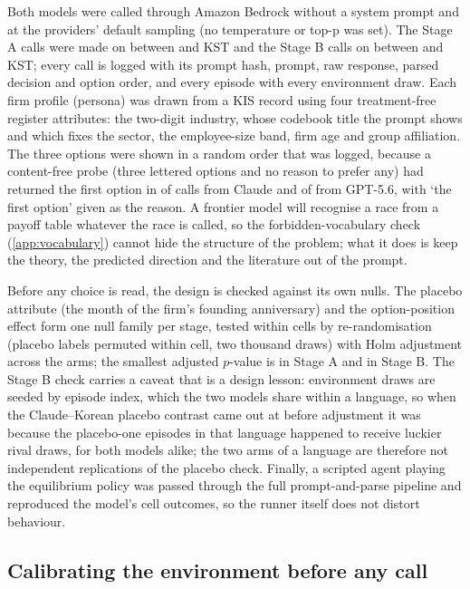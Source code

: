 \documentclass[preprint,12pt,authoryear]{elsarticle}
\begin{document}
Both models were called through Amazon Bedrock without a system prompt and at the providers' default sampling (no temperature or top-p was set). The Stage A calls were made on \StageACallsDate{} between \StageACallsFirstKST{} and \StageACallsLastKST{} KST and the Stage B calls on \StageBCallsDate{} between \StageBCallsFirstKST{} and \StageBCallsLastKST{} KST; every call is logged with its prompt hash, prompt, raw response, parsed decision and option order, and every episode with every environment draw. Each firm profile (persona) was drawn from a KIS record using four treatment-free register attributes: the two-digit industry, whose codebook title the prompt shows and which fixes the sector, the employee-size band, firm age and group affiliation. The three options were shown in a random order that was logged, because a content-free probe (three lettered options and no reason to prefer any) had returned the first option in \ProbeFableFirstOption{} of \ProbeFableCalls{} calls from Claude and \ProbeGptFirstOption{} of \ProbeGptCalls{} from GPT-5.6, with `the first option' given as the reason. A frontier model will recognise a race from a payoff table whatever the race is called, so the forbidden-vocabulary check (\ref{app:vocabulary}) cannot hide the structure of the problem; what it does is keep the theory, the predicted direction and the literature out of the prompt.

Before any choice is read, the design is checked against its own nulls. The placebo attribute (the month of the firm's founding anniversary) and the option-position effect form one null family per stage, tested within cells by re-randomisation (placebo labels permuted within cell, two thousand draws) with Holm adjustment across the arms; the smallest adjusted $p$-value is \StageAPlaceboMinHolm{} in Stage A and \StageBPlaceboMinHolm{} in Stage B. The Stage B check carries a caveat that is a design lesson: environment draws are seeded by episode index, which the two models share within a language, so when the Claude--Korean placebo contrast came out at \StageBPlaceboMinRaw{} before adjustment it was because the placebo-one episodes in that language happened to receive luckier rival draws, for both models alike; the two arms of a language are therefore not independent replications of the placebo check. Finally, a scripted agent playing the equilibrium policy was passed through the full prompt-and-parse pipeline and reproduced the model's cell outcomes, so the runner itself does not distort behaviour.

\subsection{Calibrating the environment before any call}
\label{app:calibration}
\end{document}
